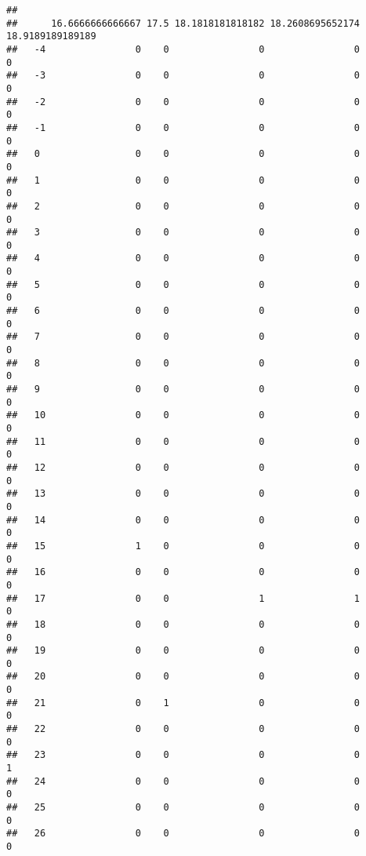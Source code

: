 \documentclass[]{article}
\begin{document}
\begin{verbatim}
##     
##      16.6666666666667 17.5 18.1818181818182 18.2608695652174 18.9189189189189
##   -4                0    0                0                0                0
##   -3                0    0                0                0                0
##   -2                0    0                0                0                0
##   -1                0    0                0                0                0
##   0                 0    0                0                0                0
##   1                 0    0                0                0                0
##   2                 0    0                0                0                0
##   3                 0    0                0                0                0
##   4                 0    0                0                0                0
##   5                 0    0                0                0                0
##   6                 0    0                0                0                0
##   7                 0    0                0                0                0
##   8                 0    0                0                0                0
##   9                 0    0                0                0                0
##   10                0    0                0                0                0
##   11                0    0                0                0                0
##   12                0    0                0                0                0
##   13                0    0                0                0                0
##   14                0    0                0                0                0
##   15                1    0                0                0                0
##   16                0    0                0                0                0
##   17                0    0                1                1                0
##   18                0    0                0                0                0
##   19                0    0                0                0                0
##   20                0    0                0                0                0
##   21                0    1                0                0                0
##   22                0    0                0                0                0
##   23                0    0                0                0                1
##   24                0    0                0                0                0
##   25                0    0                0                0                0
##   26                0    0                0                0                0

\end{verbatim}
\end{document}
